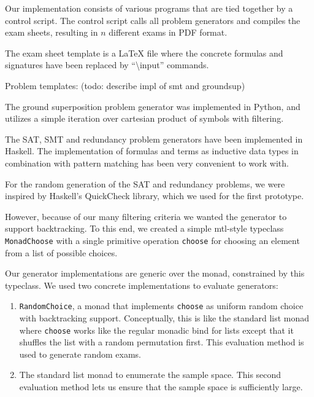 Our implementation consists of various programs that are tied together by a control script.
The control script calls all problem generators
and compiles the exam sheets, resulting in $n$ different exams in PDF format.

The exam sheet template is a \LaTeX{} file
where the concrete formulas and signatures
have been replaced by ``\textbackslash{}input'' commands.



Problem templates: (todo: describe impl of smt and groundsup)


The ground superposition problem generator was implemented in Python,
and utilizes a simple iteration over cartesian product of symbols
with filtering.

The SAT, SMT and redundancy problem generators have been implemented in Haskell.
The implementation of formulas and terms as inductive data types
in combination with pattern matching has been very convenient to work with.

For the random generation of the SAT and redundancy problems,
we were inspired by Haskell's QuickCheck library,
which we used for the first prototype.

However, because of our many filtering criteria we wanted the generator to support backtracking.
To this end,
we created a simple mtl-style typeclass \texttt{MonadChoose}
with a single primitive operation \texttt{choose} for choosing an element from a list of possible choices.

Our generator implementations are generic over the monad, constrained by this typeclass.
We used two concrete implementations to evaluate generators:
\begin{enumerate}
    \item
        \texttt{RandomChoice}, a monad that implements \texttt{choose}
        as uniform random choice with backtracking support.
        Conceptually, this is like the standard list monad
        where \texttt{choose} works like the regular monadic bind for lists
        except that it shuffles the list with a random permutation first.
        This evaluation method is used to generate random exams.
    \item
        The standard list monad to enumerate the sample space.
        This second evaluation method lets us ensure that the sample space is sufficiently large.
\end{enumerate}
